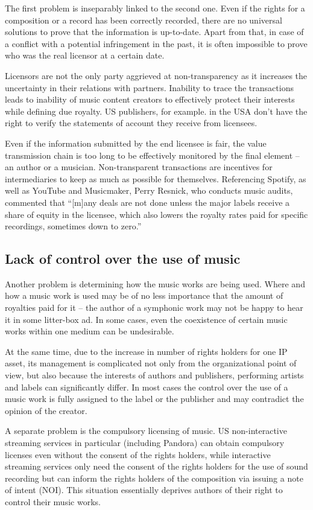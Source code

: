 \documentclass[12pt]{report}
\begin{document}
The first problem is inseparably linked to the second one. Even if the rights for a composition or a record has been correctly recorded, there are no universal solutions to prove that the information is up-to-date. Apart from that, in case of a conflict with a potential infringement in the past, it is often impossible to prove who was the real licensor at a certain date.
 
Licensors are not the only party aggrieved at non-transparency as it increases the uncertainty in their relations with partners. Inability to trace the transactions leads to inability of music content creators to effectively protect their interests while defining due royalty. US publishers, for example. in the USA don’t have the right to verify the statements of account they receive from licensees.
 
Even if the information submitted by the end licensee is fair, the value transmission chain is too long to be effectively monitored by the final element – an author or a musician. Non-transparent transactions are incentives for intermediaries to keep as much as possible for themselves. Referencing Spotify, as well as YouTube and Musicmaker, Perry Resnick, who conducts music audits, commented that “[m]any deals are not done unless the major labels receive a share of equity in the licensee, which also lowers the royalty rates paid for specific recordings, sometimes down to zero.”

\subsection{Lack of control over the use of music}
Another problem is determining how the music works are being used. Where and how a music work is used may be of no less importance that the amount of royalties paid for it – the author of a symphonic work may not be happy to hear it in some litter-box ad. In some cases, even the coexistence of certain music works within one medium can be undesirable.
 
At the same time, due to the increase in number of rights holders for one IP asset, its management is complicated not only from the organizational point of view, but also because the interests of authors and publishers, performing artists and labels can significantly differ. In most cases the control over the use of a music work is fully assigned to the label or the publisher and may contradict the opinion of the creator.
 
A separate problem is the compulsory licensing of music. US non-interactive streaming services in particular (including Pandora) can obtain compulsory licenses even without the consent of the rights holders, while interactive streaming services only need the consent of the rights holders for the use of sound recording but can inform the rights holders of the composition via issuing a note of intent (NOI). This situation essentially deprives authors of their right to control their music works.
\end{document}
